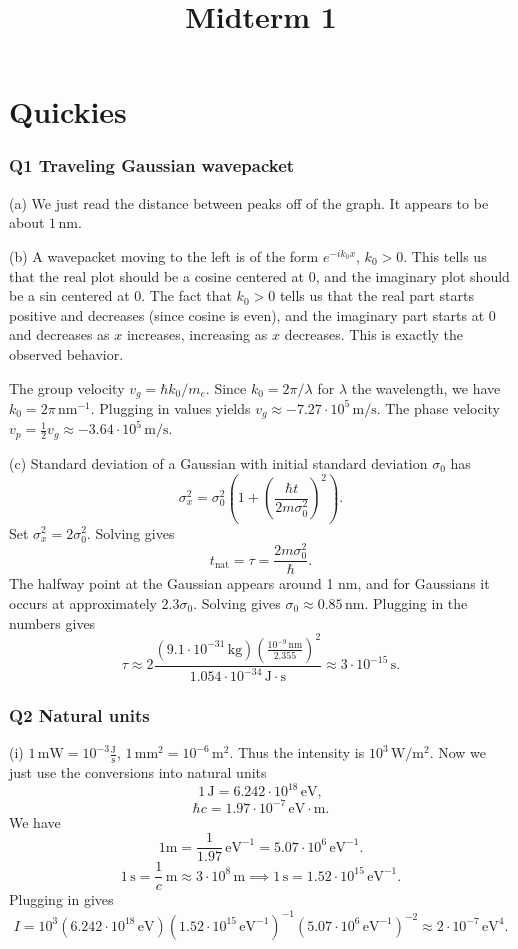 \documentclass[11pt, letterpaper]{article}
\title{Midterm 1}
\theoremstyle{plain}
\begin{document}
\makeproblem
\part{Quickies}
\section{Q1 Traveling Gaussian wavepacket}

(a) We just read the distance between peaks off of the graph. It appears to be about $1\,\mathrm{nm} $.

(b) A wavepacket moving to the left is of the form $e^{-ik_0x} $, $k_0>0$. This tells us that the real plot should be a cosine centered at 0, and the imaginary plot should be a sin centered at 0. The fact that $k_0>0$ tells us that the real part starts positive and decreases (since cosine is even), and the imaginary part starts at 0 and decreases as $x$ increases, increasing as $x$ decreases. This is exactly the observed behavior.

The group velocity $v_g=\hbar k_0/m_e$. Since $k_0=2\pi /\lambda $ for $\lambda $ the wavelength, we have $k_0=2\pi \,\mathrm{nm} ^{-1} $. Plugging in values yields $v_g \approx -7.27 \cdot 10^5 \,\mathrm{m} /\mathrm{s} $. The phase velocity $v_p=\frac{1}{2} v_g \approx -3.64\cdot 10^5\,\mathrm{m} /\mathrm{s} $.

(c) Standard deviation of a Gaussian with initial standard deviation $\sigma _0$ has
\[
	\sigma _x^2=\sigma _0^2 \left( 1+\left( \frac{\hbar t}{2m\sigma _0^2}  \right) ^2 \right) 
.\]
Set $\sigma _x^2=2\sigma _0^2$. Solving gives
\[
	t_{\mathrm{nat} } =\tau =\frac{2m\sigma _0^2}{\hbar} 
.\]
The halfway point at the Gaussian appears around 1 nm, and for Gaussians it occurs at approximately $2.3 \sigma _0$. Solving gives $\sigma _0 \approx 0.85\,\mathrm{nm} $. Plugging in the numbers gives
\[
	\tau \approx 2\frac{\left( 9.1\cdot 10^{-31} \,\mathrm{kg}  \right) \left( \frac{10^{-9} \,\mathrm{nm} }{2.355}  \right) ^2}{1.054\cdot 10^{-34} \,\mathrm{J} \cdot \mathrm{s} } \approx 3\cdot 10^{-15} \,\mathrm{s} 
.\]

\section{Q2 Natural units}

(i) $1\,\mathrm{mW} =10^{-3} \frac{\mathrm{J} }{\mathrm{s} } $, $1\,\mathrm{mm} ^2=10^{-6} \,\mathrm{m} ^2$. Thus the intensity is $10^3\,\mathrm{W} /\mathrm{m} ^2$. Now we just use the conversions into natural units
\[
	1\,\mathrm{J} =6.242\cdot 10^{18} \,\mathrm{eV} ,
\]
\[
	\hbar c=1.97\cdot 10^{-7} \,\mathrm{eV} \cdot \mathrm{m} 
.\]
We have
\[
	1\mathrm{m} =\frac{1}{1.97} \,\mathrm{eV} ^{-1} =5.07\cdot 10^{6} \,\mathrm{eV} ^{-1} 
.\]
\[
	1\,\mathrm{s} =\frac{1}{c} \,\mathrm{m} \approx 3\cdot 10^8\,\mathrm{m} \implies 1\,\mathrm{s} =1.52\cdot 10^{15} \,\mathrm{eV} ^{-1} 
.\]
Plugging in gives
\[
	I=10^3\left( 6.242\cdot 10^{18} \,\mathrm{eV}  \right) \left( 1.52\cdot 10^{15} \,\mathrm{eV} ^{-1}  \right) ^{-1} \left( 5.07\cdot 10^6\,\mathrm{eV} ^{-1}  \right) ^{-2} \approx 2\cdot 10^{-7} \,\mathrm{eV} ^4
.\]
\end{document}
